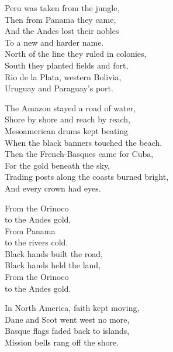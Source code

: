 \begin{lyrics}
Peru was taken from the jungle,\\
Then from Panama they came,\\
And the Andes lost their nobles\\
To a new and harder name.\\
North of the line they ruled in colonies,\\
South they planted fields and fort,\\
Rio de la Plata, western Bolivia,\\
Uruguay and Paraguay's port.

The Amazon stayed a road of water,\\
Shore by shore and reach by reach,\\
Mesoamerican drums kept beating\\
When the black banners touched the beach.\\
Then the French-Basques came for Cuba,\\
For the gold beneath the sky,\\
Trading posts along the coasts burned bright,\\
And every crown had eyes.

From the Orinoco\\
to the Andes gold,\\
From Panama\\
to the rivers cold.\\
Black hands built the road,\\
Black hands held the land,\\
From the Orinoco\\
to the Andes gold.

In North America, faith kept moving,\\
Dane and Scot went west no more,\\
Basque flags faded back to islands,\\
Mission bells rang off the shore.
\end{lyrics}

